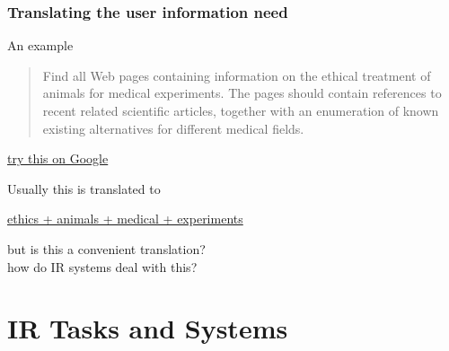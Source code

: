 \documentclass[svgnames]{beamer}
\begin{document}
\begin{frame} \frametitle{Translating the user information need}
    
    \begin{block}{An example}
        \begin{quote}
            Find all Web pages containing information on the ethical treatment of
            animals for medical experiments. The pages should contain references to
            recent related scientific articles, together with an enumeration of known
            existing alternatives for different medical fields.
        \end{quote}
        \begin{flushright}
            \small
            \href{http://www.google.pt/search?q=Find+all+Web+pages+containing+information+on+the+ethical+treatment+of\%0D\%0A++++++animals+for+medical+experiments.+The+pages+should+contain+references+to\%0D\%0A++++++recent+related+scientific+articles\%2C+together+with+an+enumeration+of+known\%0D\%0A++++++existing+alternatives+for+different+medical+fields.}{try this on Google}
        \end{flushright}
    \end{block}

    \pause

    \begin{block}{}
        Usually this is translated to
        \begin{center}
            \href{http://www.google.pt/search?q=ethics+animals+medical+experiments}{ethics + animals + medical + experiments}
        \end{center}
        \vspace{-1\baselineskip}
        \begin{flushright}
            but is this a convenient translation?\\
            how do IR systems deal with this?
        \end{flushright}
    \end{block}


\end{frame}



\section{IR Tasks and Systems}
\end{document}
